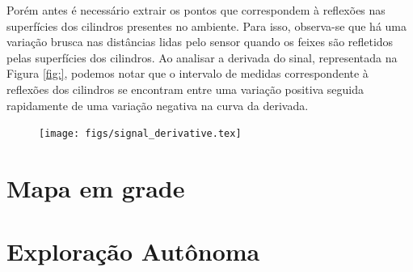 Porém antes é necessário extrair os pontos que correspondem à reflexões nas 
superfícies dos cilindros presentes no ambiente. Para isso, observa-se que há uma variação brusca nas distâncias lidas pelo sensor quando os feixes são 
refletidos pelas superfícies dos cilindros. Ao analisar a derivada do sinal, 
representada na Figura \ref{fig:}, podemos notar que o intervalo de medidas 
correspondente à reflexões dos cilindros se encontram entre uma variação 
positiva seguida rapidamente de uma variação negativa na curva da derivada.

\begin{figure}[h]
  \centering
  \texttt{[image: figs/signal\_derivative.tex]}
\end{figure}


\section{Mapa em grade}
\section{Exploração Autônoma}
